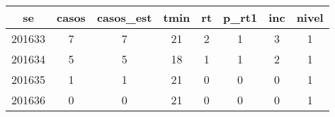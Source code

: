 \begin{tabular}{c|ccccccc}
  \hline
se & casos & casos\_est & tmin & rt & p\_rt1 & inc & nivel \\ 
  \hline
201633 & 7 & 7 & 21 & 2 & 1 & 3 & 1 \\ 
  201634 & 5 & 5 & 18 & 1 & 1 & 2 & 1 \\ 
  201635 & 1 & 1 & 21 & 0 & 0 & 0 & 1 \\ 
  201636 & 0 & 0 & 21 & 0 & 0 & 0 & 1 \\ 
   \hline
\end{tabular}
